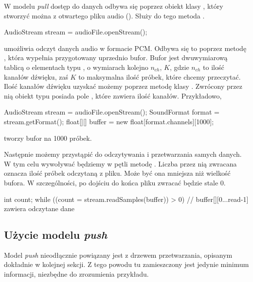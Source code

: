W modelu \emph{pull} dostęp do danych odbywa się poprzez obiekt klasy , który
stworzyć można z otwartego pliku audio (). Służy do tego metoda .

\begin{java}
AudioStream stream = audioFile.openStream();
\end{java}

 umożliwia odczyt danych audio w formacie PCM. Odbywa się to poprzez metodę
, która wypełnia przygotowany uprzednio bufor. Bufor jest dwuwymiarową tablicą o
elementach typu , o wymiarach kolejno $n_{ch}$, $K$, gdzie $n_{ch}$ to ilość kanałów
dźwięku, zaś $K$ to maksymalna ilość próbek, które chcemy przeczytać. Ilość kanałów dźwięku uzyskać
możemy poprzez metodę  klasy .  Zwrócony przez nią obiekt typu
 posiada pole , które zawiera ilość kanałów.  Przykładowo,

\begin{java}
AudioStream stream = audioFile.openStream();
SoundFormat format = stream.getFormat();
float[][] buffer = new float[format.channels][1000];
\end{java}

tworzy bufor na 1000 próbek.

Następnie możemy przystąpić do odczytywania i przetwarzania samych danych. W tym celu wywoływać
będziemy w pętli metodę . Liczba przez nią zwracana oznacza ilość próbek odczytaną
z pliku. Może być ona mniejsza niż wielkość bufora. W szczególności, po dojściu do końca pliku
 zwracać będzie stale 0.

\begin{java}
int count;
while ((count = stream.readSamples(buffer)) > 0) {
    // buffer[][0...read-1] zawiera odczytane dane
}
\end{java}

\subsection{Użycie modelu \emph{push}}

\begin{Note}
Model \emph{push} nieodłącznie powiązany jest z drzewem przetwarzania, opisanym dokładnie w kolejnej
sekcji. Z tego powodu tu zamieszczony jest jedynie minimum informacji, niezbędne do zrozumienia
przykładu.
\end{Note}

